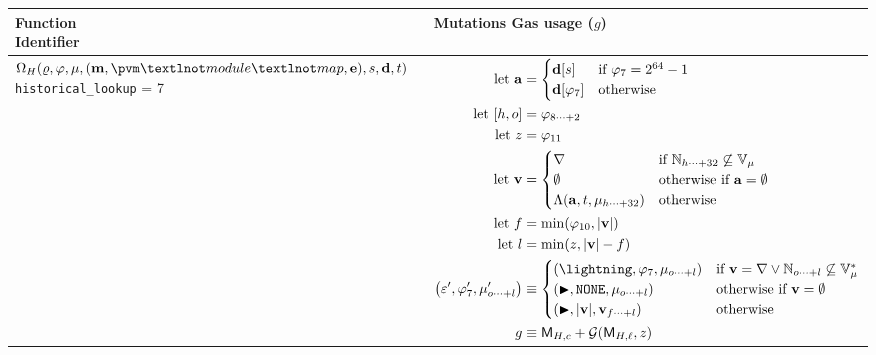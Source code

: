 \begin{longtable}{p{4cm} p{12cm}}
  \toprule
  \thead*{\textbf{Function} \\ \textbf{Identifier}} &
  \thead{\textbf{Mutations} \\ \textbf{Gas usage (}$g$\textbf{)}} \\
  \cmidrule(lr){1-1}\cmidrule(lr){2-2}
  \endhead
  \makecell*[l]{
  $\Omega_H(\gascounter, \registers, \memory, \tup{\mathbf{m}, \pvm¬module¬map, \mathbf{e}}, s, \mathbf{d}, t)$ \\
  \texttt{historical\_lookup} = 7} &
  $\begin{aligned}
    \using \mathbf{a} &= \begin{cases}
      \mathbf{d}\subb{s} &\when \registers_7 = 2^{64} - 1 \\
      \mathbf{d}[\registers_7] &\otherwise
    \end{cases} \\
    \using \sq{h, o} &= \registers\subrange{8}{2} \\
    \using z &= \registers_{11} \\
    \using \mathbf{v} &= \begin{cases}
      \error &\when \Nrange{h}{32} \not\subseteq \readable{\memory} \\
      \none &\otherwhen \mathbf{a} = \none \\
      \histlookup(\mathbf{a}, t, \memory\subrange{h}{32}) &\otherwise \\
    \end{cases} \\
    \using f &= \min(\registers_{10}, \len{\mathbf{v}}) \\
    \using l &= \min(z, \len{\mathbf{v}} - f) \\
    \tup{\execst', \registers'_7, \memory'\subrange{o}{l}} &\equiv \begin{cases}
      \tup{\panic, \registers_7, \memory\subrange{o}{l}} &\when \mathbf{v} = \error \vee \Nrange{o}{l} \not\subseteq \writable{\memory}\\
      \tup{\continue, \mathtt{NONE}, \memory\subrange{o}{l}} &\otherwhen \mathbf{v} = \none \\
      \tup{\continue, \len{\mathbf{v}}, \mathbf{v}\subrange{f}{l}} &\otherwise \\
    \end{cases} \\
    g &\equiv \CgasHconst + \fnmemgas(\CgasHlinear, z)
  \end{aligned}$\\

\end{longtable}

